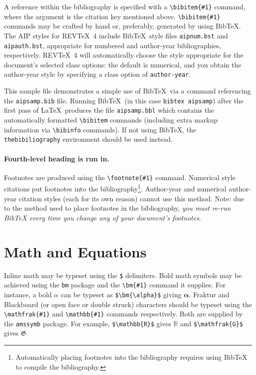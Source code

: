 \documentclass[%
 aip,
 amsmath,amssymb,
reprint, onecolumn %
]{revtex4-1}
\begin{document}
A reference within the bibliography is specified with a \verb+\bibitem{#1}+ command,
where the argument is the citation key mentioned above. 
\verb+\bibitem{#1}+ commands may be crafted by hand or, preferably,
generated by using Bib\TeX. 
The AIP styles for REV\TeX~4 include Bib\TeX\ style files
\verb+aipnum.bst+ and \verb+aipauth.bst+, appropriate for
numbered and author-year bibliographies,
respectively. 
REV\TeX~4 will automatically choose the style appropriate for 
the document's selected class options: the default is numerical, and
you obtain the author-year style by specifying a class option of \verb+author-year+.

This sample file demonstrates a simple use of Bib\TeX\ 
via a \verb++ command referencing the \verb+aipsamp.bib+ file.
Running Bib\TeX\ (in this case \texttt{bibtex
aipsamp}) after the first pass of \LaTeX\ produces the file
\verb+aipsamp.bbl+ which contains the automatically formatted
\verb+\bibitem+ commands (including extra markup information via
\verb+\bibinfo+ commands). If not using Bib\TeX, the
\verb+thebibiliography+ environment should be used instead.

\paragraph{Fourth-level heading is run in.}%
Footnotes are produced using the \verb+\footnote{#1}+ command. 
Numerical style citations put footnotes into the 
bibliography\footnote{Automatically placing footnotes into the bibliography requires using BibTeX to compile the bibliography.}.
Author-year and numerical author-year citation styles (each for its own reason) cannot use this method. 
Note: due to the method used to place footnotes in the bibliography, \emph{you
must re-run BibTeX every time you change any of your document's
footnotes}. 

\section{Math and Equations}
Inline math may be typeset using the \verb+$+ delimiters. Bold math
symbols may be achieved using the \verb+bm+ package and the
\verb+\bm{#1}+ command it supplies. For instance, a bold $\alpha$ can
be typeset as \verb+$\bm{\alpha}$+ giving $\bm{\alpha}$. Fraktur and
Blackboard (or open face or double struck) characters should be
typeset using the \verb+\mathfrak{#1}+ and \verb+\mathbb{#1}+ commands
respectively. Both are supplied by the \texttt{amssymb} package. For
example, \verb+$\mathbb{R}$+ gives $\mathbb{R}$ and
\verb+$\mathfrak{G}$+ gives $\mathfrak{G}$
\end{document}
